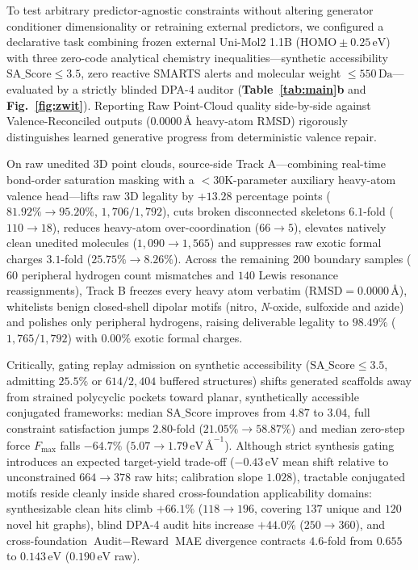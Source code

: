 \documentclass[11pt,a4paper]{article}
\begin{document}
To test arbitrary predictor-agnostic constraints without altering generator conditioner dimensionality or retraining external predictors, we configured a declarative task combining frozen external Uni-Mol2 1.1B ($\text{HOMO}\pm 0.25\,\text{eV}$) with three zero-code analytical chemistry inequalities---synthetic accessibility $\text{SA\_Score}\le 3.5$, zero reactive SMARTS alerts and molecular weight $\le 550\,\text{Da}$---evaluated by a strictly blinded DPA-4 auditor (\textbf{Table~\ref{tab:main}b} and \textbf{Fig.~\ref{fig:zwit}}). Reporting Raw Point-Cloud quality side-by-side against Valence-Reconciled outputs ($0.0000\,\text{\AA}$ heavy-atom RMSD) rigorously distinguishes learned generative progress from deterministic valence repair.

On raw unedited 3D point clouds, source-side Track A---combining real-time bond-order saturation masking with a $<30\text{K}$-parameter auxiliary heavy-atom valence head---lifts raw 3D legality by $+13.28$ percentage points ($81.92\% \to 95.20\%$, $1{,}706/1{,}792$), cuts broken disconnected skeletons $6.1$-fold ($110 \to 18$), reduces heavy-atom over-coordination ($66 \to 5$), elevates natively clean unedited molecules ($1{,}090 \to 1{,}565$) and suppresses raw exotic formal charges $3.1$-fold ($25.75\% \to 8.26\%$). Across the remaining $200$ boundary samples ($60$ peripheral hydrogen count mismatches and $140$ Lewis resonance reassignments), Track B freezes every heavy atom verbatim ($\text{RMSD} = 0.0000\,\text{\AA}$), whitelists benign closed-shell dipolar motifs (nitro, \textit{N}-oxide, sulfoxide and azide) and polishes only peripheral hydrogens, raising deliverable legality to $98.49\%$ ($1{,}765/1{,}792$) with $0.00\%$ exotic formal charges.

Critically, gating replay admission on synthetic accessibility ($\text{SA\_Score}\le 3.5$, admitting $25.5\%$ or $614/2{,}404$ buffered structures) shifts generated scaffolds away from strained polycyclic pockets toward planar, synthetically accessible conjugated frameworks: median $\text{SA\_Score}$ improves from $4.87$ to $3.04$, full constraint satisfaction jumps $2.80$-fold ($21.05\% \to 58.87\%$) and median zero-step force $F_{\max}$ falls $-64.7\%$ ($5.07 \to 1.79\,\text{eV}\,\text{\AA}^{-1}$). Although strict synthesis gating introduces an expected target-yield trade-off ($-0.43\,\text{eV}$ mean shift relative to unconstrained $664 \to 378$ raw hits; calibration slope $1.028$), tractable conjugated motifs reside cleanly inside shared cross-foundation applicability domains: synthesizable clean hits climb $+66.1\%$ ($118 \to 196$, covering $137$ unique and $120$ novel hit graphs), blind DPA-4 audit hits increase $+44.0\%$ ($250 \to 360$), and cross-foundation $\text{Audit}-\text{Reward}$ MAE divergence contracts $4.6$-fold from $0.655$ to $0.143\,\text{eV}$ ($0.190\,\text{eV}$ raw).
\end{document}
